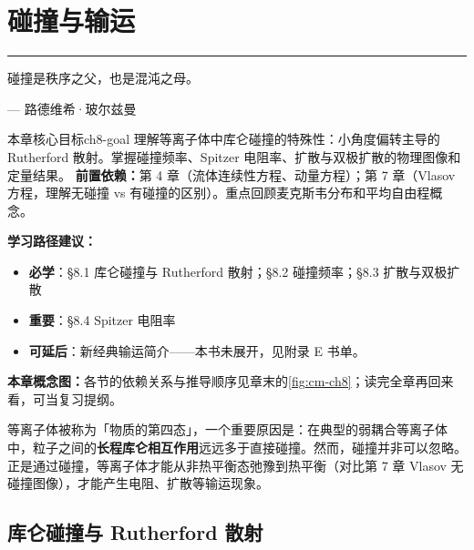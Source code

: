 \documentclass[12pt,a4paper,openany,oneside]{book}
\newcommand{\diffmarktext}[1]{%
  \textcolor{coverMid!80}{\rule[-0.1em]{2pt}{0.9em}}\,%
  \textcolor{coverMid}{\footnotesize\textbf{[#1]}}%
}
\newcommand{\difficulty}[1]{\marginnote{\raggedright\diffmarktext{#1}}}
\let\plainepigraph\epigraph
\renewcommand{\epigraph}[2]{%
  \par\addvspace{1.5pt}\noindent\hfill{\color{figAmber!75}\rule{2.8cm}{0.6pt}}\par
  \vspace{0.6pt}\plainepigraph{#1}{#2}}
\begin{document}




\chapter{碰撞与输运}\label{ch:8}
\epigraph{碰撞是秩序之父，也是混沌之母。}{--- 路德维希·玻尔兹曼}

\begin{insight}{本章核心目标}{ch8-goal}
理解等离子体中库仑碰撞的特殊性：小角度偏转主导的 Rutherford 散射。掌握碰撞频率、Spitzer 电阻率、扩散与双极扩散的物理图像和定量结果。
\tcblower
\textbf{前置依赖：}第 4 章（流体连续性方程、动量方程）；第 7 章（Vlasov 方程，理解无碰撞 vs 有碰撞的区别）。重点回顾麦克斯韦分布和平均自由程概念。

\textbf{学习路径建议：}

\begin{itemize}[leftmargin=*]
\item[\textcolor{red}{$\blacksquare$}] \textbf{必学}：\S 8.1 库仑碰撞与 Rutherford 散射；\S 8.2 碰撞频率；\S 8.3 扩散与双极扩散
\item[\textcolor{orange}{$\blacksquare$}] \textbf{重要}：\S 8.4 Spitzer 电阻率
\item[\textcolor{green}{$\blacksquare$}] \textbf{可延后}：新经典输运简介——本书未展开，见附录 E 书单。
\end{itemize}
\textbf{本章概念图：}各节的依赖关系与推导顺序见章末的\cref{fig:cm-ch8}；读完全章再回来看，可当复习提纲。
\end{insight}

等离子体被称为「物质的第四态」，一个重要原因是：在典型的弱耦合等离子体中，粒子之间的\textbf{长程库仑相互作用}远远多于直接碰撞。然而，碰撞并非可以忽略。正是通过碰撞，等离子体才能从非热平衡态弛豫到热平衡（对比第 7 章 Vlasov 无碰撞图像），才能产生电阻、扩散等输运现象。

\section{库仑碰撞与 Rutherford 散射}\difficulty{基础}
\label{sec:ch8-collisions}
\end{document}
